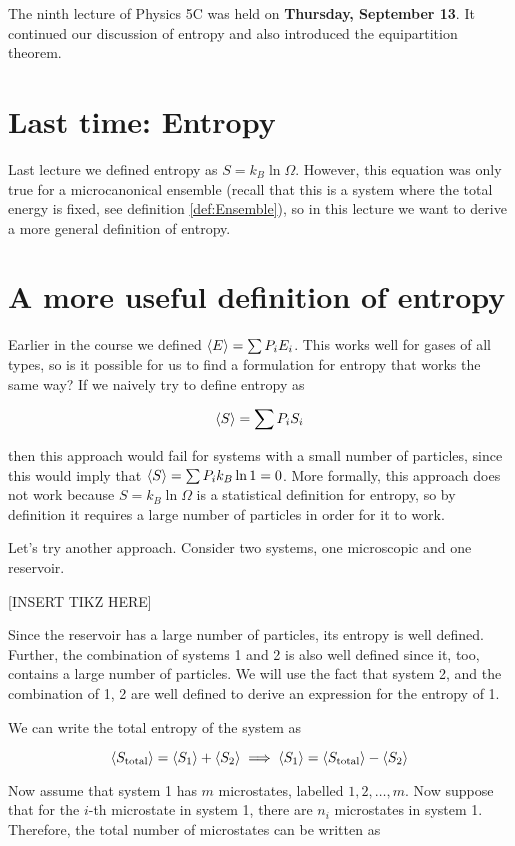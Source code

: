 The ninth lecture of Physics 5C was held on  \textbf{Thursday, September 13}. It continued our discussion of entropy and also introduced the equipartition theorem. 

\section{Last time: Entropy} 

Last lecture we defined entropy as $S = k_B \ln \Omega$. However, this equation was only true for a microcanonical ensemble (recall that this is a system where the total energy is fixed, see definition \ref{def:Ensemble}), so in this lecture we want to derive a more general definition of entropy.

\section{A more useful definition of entropy}

Earlier in the course we defined $\langle E \rangle = \sum P_i E_i$. This works well for gases of all types, so is it possible for us to find a formulation for entropy that works the same way? If we naively try to define entropy as 

\[ \langle S \rangle = \sum P_i S_i\] 

then this approach would fail for systems with a small number of particles, since this would imply that $\langle S \rangle = \sum P_i k_B \ln 1 = 0$. More formally, this approach does not work because $S = k_B \ln \Omega$ is a statistical definition for entropy, so by definition it requires a large number of particles in order for it to work.

Let's try another approach. Consider two systems, one microscopic and one reservoir. 

[INSERT TIKZ HERE]

Since the reservoir has a large number of particles, its entropy is well defined. Further, the combination of systems 1 and 2 is also well defined since it, too, contains a large number of particles. We will use the fact that system 2, and the combination of 1, 2 are well defined to derive an expression for the entropy of 1. 

We can write the total entropy of the system as

\[ \langle S_{\text{total}} \rangle = \langle S_1 \rangle + \langle S_2 \rangle \implies \langle S_1 \rangle = \langle S_{\text{total}} \rangle - \langle S_2 \rangle\]

Now assume that system 1 has $m$ microstates, labelled $1, 2, \dots, m$. Now suppose that for the $i$-th microstate in system 1, there are $n_i$ microstates in system 1. Therefore, the total number of microstates can be written as 

